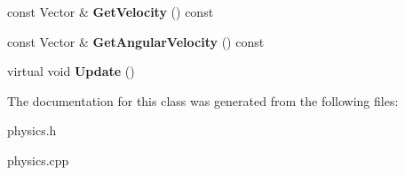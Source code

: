 \begin{DoxyCompactItemize}
\item 
const Vector \& {\bfseries Get\+Velocity} () const \hypertarget{classPhysicsSystem_a75f6ab4aa5734de47fd19ec30dcaa604}{}\label{classPhysicsSystem_a75f6ab4aa5734de47fd19ec30dcaa604}

\item 
const Vector \& {\bfseries Get\+Angular\+Velocity} () const \hypertarget{classPhysicsSystem_aab98cda7d7ce0dd9b86bb6969e16d485}{}\label{classPhysicsSystem_aab98cda7d7ce0dd9b86bb6969e16d485}

\item 
virtual void {\bfseries Update} ()\hypertarget{classPhysicsSystem_afb208c7090cff19c8c56022cfe8fec9e}{}\label{classPhysicsSystem_afb208c7090cff19c8c56022cfe8fec9e}

\end{DoxyCompactItemize}


The documentation for this class was generated from the following files\+:\begin{DoxyCompactItemize}
\item 
physics.\+h\item 
physics.\+cpp\end{DoxyCompactItemize}
